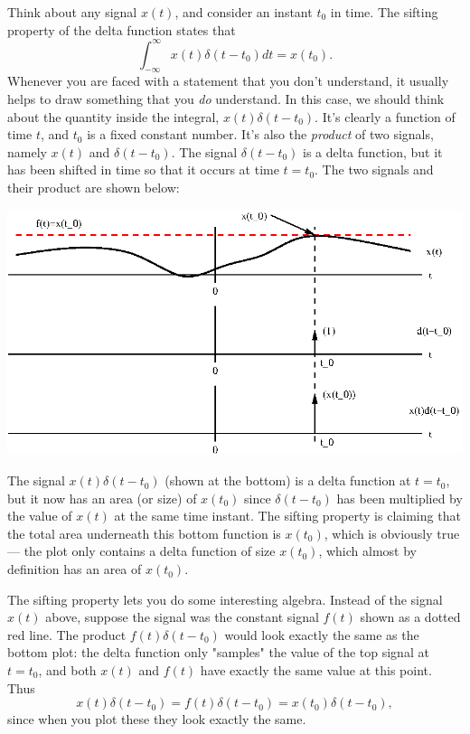 \documentclass[10pt]{beamer}
\begin{document}
Think about any signal $x(t)$, and consider an instant $t_0$ in time.  The sifting property of the delta function states that
\begin{equation*}
  \int_{-\infty}^{\infty} x(t) \delta(t - t_0) dt = x(t_0).
\end{equation*}
Whenever you are faced with a statement that you don't understand, it usually helps to draw something that you {\em do} understand.  In this case, we should think about the quantity inside the integral, $x(t) \delta(t - t_0)$.  It's clearly a function of time $t$, and $t_0$ is a fixed constant number.  It's also the {\em product} of two signals, namely $x(t)$ and $\delta(t - t_0)$.  The signal $\delta(t - t_0)$ is a delta function, but it has been shifted in time so that it occurs at time $t = t_0$.  The two signals and their product are shown below:
\begin{center}
  \includegraphics{siftingproperty}
\end{center}
The signal $x(t) \delta(t - t_0)$ (shown at the bottom) is a delta function at $t = t_0$, but it now has an area (or size) of $x(t_0)$ since $\delta(t-t_0)$ has been multiplied by the value of $x(t)$ at the same time instant.  The sifting property is claiming that the total area underneath this bottom function is $x(t_0)$, which is obviously true --- the plot only contains a delta function of size $x(t_0)$, which almost by definition has an area of $x(t_0)$.

The sifting property lets you do some interesting algebra.  Instead of the signal $x(t)$ above, suppose the signal was the constant signal $f(t)$ shown as a dotted red line.  The product $f(t) \delta(t - t_0)$ would look exactly the same as the bottom plot:  the delta function only "samples" the value of the top signal at $t=t_0$, and both $x(t)$ and $f(t)$ have exactly the same value at this point.  
Thus
\begin{equation*}
  x(t) \delta(t-t_0) = f(t) \delta(t-t_0) = x(t_0) \delta(t - t_0),
\end{equation*}
since when you plot these they look exactly the same.  
\end{document}
